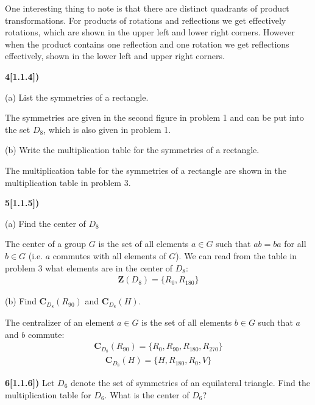 \documentclass[12pt,a4paper]{article}
\newcommand{\prob}[2]{\textbf{#1)} #2}
\begin{document}
One interesting thing to note is that there are distinct quadrants of product transformations. For products of rotations and reflections we get effectively rotations, which are shown in the upper left and lower right corners. However when the product contains one reflection and one rotation we get reflections effectively, shown in the lower left and upper right corners.

\prob{4[1.1.4]}{}

(a) List the symmetries of a rectangle.

The symmetries are given in the second figure in problem 1 and can be put into the set $D_8$, which is also given in problem 1.

(b) Write the multiplication table for the symmetries of a rectangle.

The multiplication table for the symmetries of a rectangle are shown in the multiplication table in problem 3.

\prob{5[1.1.5]}{}

(a) Find the center of $D_8$

The center of a group $G$ is the set of all elements $a \in G$ such that $ab = ba$ for all $b \in G$ (i.e. $a$ commutes with all elements of $G$). We can read from the table in problem 3 what elements are in the center of $D_8$:
\begin{align*}
\mathbf{Z}(D_8) = \{R_0,R_{180}\}
\end{align*}

(b) Find $\mathbf{C}_{D_8}(R_{90})$ and $\mathbf{C}_{D_8}(H)$.

The centralizer of an element $a \in G$ is the set of all elements $b \in G$ such that $a$ and $b$ commute:
\begin{align*}
\mathbf{C}_{D_8}(R_{90}) = \{R_{0},R_{90},R_{180},R_{270}\}
\end{align*}
\begin{align*}
\mathbf{C}_{D_8}(H) = \{H,R_{180},R_{0},V\}
\end{align*}

\prob{6[1.1.6]}{Let $D_6$ denote the set of symmetries of an equilateral triangle. Find the multiplication table for $D_6$. What is the center of $D_6$?}
\end{document}
